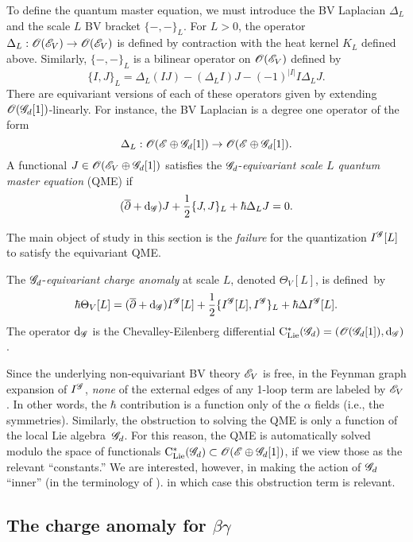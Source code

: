 To define the quantum master equation, we must introduce the BV Laplacian $\Delta_L$ and the scale $L$ BV bracket $\{-,-\}_L$. 
For $L > 0$, the operator $\Delta_L : \mathscr O(\mathscr E_V) \to \mathscr O(\mathscr E_V)$ is defined by contraction with the heat kernel $K_L$ defined above. 
Similarly, $\{-,-\}_L$ is a bilinear operator on $\mathscr O(\mathscr E_V)$ defined by
\[
\{I,J\}_L = \Delta_L(IJ) - (\Delta_L I)J - (-1)^{|I|} I \Delta_L J .
\] 
There are equivariant versions of each of these operators given by extending $\mathscr O(\mathscr G_d[1])$-linearly.
For instance, the BV Laplacian is a degree one operator of the form
\[
\Delta_L : \mathscr O(\mathscr E \oplus \mathscr G_d[1]) \to \mathscr O(\mathscr E \oplus \mathscr G_d[1]) .
\]
A functional $J \in \mathscr O(\mathscr E_V \oplus \mathscr G_d[1])$ satisfies the $\mathscr G_d$-{\em equivariant scale $L$ quantum master equation} (QME) if
\[
(\overline{\partial} + {\rm d}_{\mathscr G}) J+ \frac{1}{2} \{J, J\}_L + \hbar \Delta_L J = 0 .
\]

The main object of study in this section is the {\em failure} for the quantization $I^{\mathscr G}[L]$ to satisfy the equivariant QME. 

\begin{dfn}
The $\mathscr G_d$-{\em equivariant charge anomaly} at scale $L$, denoted $ \Theta_V [L]$, is defined~by
\[
\hbar \Theta_V [L] = (\overline{\partial} + {\rm d}_{\mathscr G}) I^{\mathscr G} [L] + \frac{1}{2} \{I^{\mathscr G}[L], I^{\mathscr G}\}_L + \hbar \Delta I^{\mathscr G}[L] .
\]
The operator ${\rm d}_{\mathscr G}$ is the Chevalley-Eilenberg differential ${\rm C}_{{\rm Lie}}^*(\mathscr G_d) = \left(\mathscr O(\mathscr G_d[1]), {\rm d}_{\mathscr G}\right)$. 
\end{dfn}


\begin{rmk}
Since the underlying non-equivariant BV theory $\mathscr E_V$ is free, 
in the Feynman graph expansion of $I^\mathscr G$,
{\em none} of the external edges of any 1-loop term are labeled by $\mathscr E_V$. 
In other words, the $\hbar$ contribution is a function only of the $\alpha$ fields (i.e., the symmetries).
Similarly, the obstruction to solving the QME is only a function of the local Lie algebra~$\mathscr G_d$.
For this reason, the QME is automatically solved modulo the space of functionals ${\rm C}_{{\rm Lie}}^*(\mathscr G_d) \subset \mathscr O(\mathscr E \oplus \mathscr G_d[1])$,
if we view those as the relevant ``constants.''
We are interested, however, in making the action of $\mathscr G_d$ ``inner'' (in the terminology of \cite{CG2}).
in which case this obstruction term is relevant.
\end{rmk}

\subsection{The charge anomaly for $\beta\gamma$}

